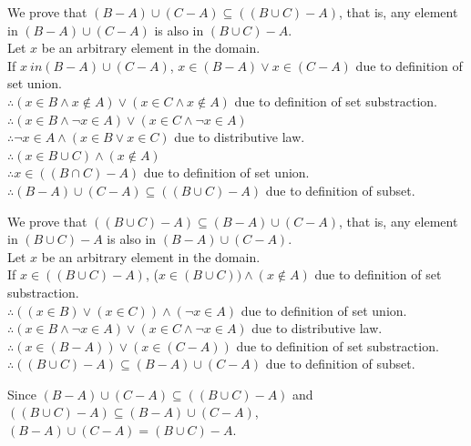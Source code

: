 \documentclass[12pt]{exam}
\begin{document}
\begin{solution}
    \begin{qparts}
        \item We prove that $(B - A) \cup (C - A) \subseteq ((B \cup C) - A)$, that is, any element in $(B - A) \cup (C - A)$ is also in $(B \cup C) - A$.\\
        Let $x$ be an arbitrary element in the domain.\\
        If $x \ in (B - A) \cup (C-A)$, $x \in (B-A) \lor x \in (C-A)$ due to definition of set union.\\
        $\therefore (x \in B \land x \notin A) \lor (x \in C \land x \notin A)$ due to definition of set substraction.\\
        $\therefore (x \in B \land \lnot x \in A) \lor (x \in C \land \lnot x \in A)$\\
        $\therefore \lnot x \in A \land (x \in B \lor x \in C)$ due to distributive law.\\
        $\therefore (x \in B \cup C) \land (x \notin A)$\\
        $\therefore x \in ((B \cap C) - A)$ due to definition of set union.\\
        $\therefore (B - A) \cup (C - A) \subseteq ((B \cup C) - A)$ due to definition of subset.
        \item We prove that $((B \cup C) - A) \subseteq (B - A) \cup (C - A)$, that is, any element in $(B \cup C) - A$ is also in $(B - A) \cup (C - A)$.\\
        Let $x$ be an arbitrary element in the domain.\\
        If $x \in ((B \cup C) - A)$, ($x \in (B \cup C)) \land (x \notin A)$ due to definition of set substraction.\\
        $\therefore ((x \in B) \lor (x \in C)) \land (\lnot x \in A)$ due to definition of set union.\\
        $\therefore (x \in B \land \lnot x \in A) \lor (x \in C \land \lnot x \in A)$ due to distributive law.\\
        $\therefore (x \in (B - A)) \lor (x \in (C - A))$ due to definition of set substraction.\\
        $\therefore ((B \cup C) - A) \subseteq (B - A) \cup (C - A)$ due to definition of subset.
    \end{qparts}
    Since $(B - A) \cup (C - A) \subseteq ((B \cup C) - A)$ and $((B \cup C) - A) \subseteq (B - A) \cup (C - A)$, 
    \\ $(B - A) \cup (C - A) = (B \cup C) - A$.
\end{solution}
\end{document}
